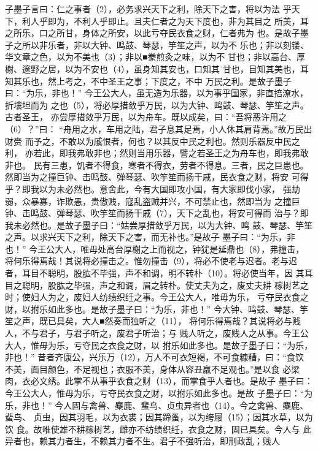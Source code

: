 \documentclass[12pt,UTF8]{ctexbook}
\begin{document}
子墨子言曰：仁之事者（2），必务求兴天下之利，除天下之害，将以为法 
乎天下，利人乎即为，不利人乎即止。且夫仁者之为天下度也，非为其目之 
所美，耳之所乐，口之所甘，身体之所安，以此亏夺民衣食之财，仁者弗为 
也。是故子墨子之所以非乐者，非以大钟、鸣鼓、琴瑟，竽笙之声，以为不 
乐也；非以刻镂、华文章之色，以为不美也（3）；非以■豢煎灸之味，以为不 
甘也；非以高台、厚榭、邃野之居，以为不安也（4），虽身知其安也，口知其 
甘也，目知其美也，耳知其乐也，然上考之，不中圣王之事；下度之，不中 
万民之利。是故子墨子曰：“为乐，非也！” 
今王公大人，虽无造为乐器，以为事乎国家，非直掊潦水，折壤坦而为 
之也（5），将必厚措敛乎万民，以为大钟、鸣鼓、琴瑟、竽笙之声。古者圣王， 
亦尝厚措敛乎万民，以为舟车。既以成矣，曰：“吾将恶许用之（6）？”曰： 
“舟用之水，车用之陆，君子息其足焉，小人休其肩背焉。”故万民出财赍 
而予之，不敢以为戚恨者，何也？以其反中民之利也。然则乐器反中民之利， 
亦若此，即我弗敢非也；然则当用乐器，譬之若圣王之为舟车也，即我弗敢 
非也。 
民有三患，饥者不得食，寒者不得衣，劳者不得息。三者，民之巨患也。 
然即当为之撞巨钟、击鸣鼓、弹琴瑟、吹竽笙而扬干戚，民衣食之财，将安 
可得乎？即我以为未必然也。意舍此，今有大国即攻小国，有大家即伐小家， 
强劫弱，众暴寡，诈欺愚，贵傲贱，寇乱盗贼并兴，不可禁止也，然即当为 
之撞巨钟、击鸣鼓、弹琴瑟、吹竽笙而扬干戚（7），天下之乱也，将安可得而 
治与？即我未必然也。是故子墨子曰：“姑尝厚措敛乎万民，以为大钟、鸣 
鼓、琴瑟、竽笙之声。以求兴天下之利，除天下之害，而无补也。”是故子 
墨子曰：“为乐，非也！” 
今王公大人，唯毋处高台厚榭之上而视之，钟犹是延鼎也（8），弗撞击， 
将何乐得焉哉！其说将必撞击之。惟勿撞击（9），将必不使老与迟者。老与迟 
者，耳目不聪明，股肱不毕强，声不和调，明不转朴（10）。将必使当年，因 
其耳目之聪明，股肱之毕强，声之和调，眉之转朴。使丈夫为之，废丈夫耕 
稼树艺之时；使妇人为之，废妇人纺绩织纴之事。今王公大人，唯毋为乐， 
亏夺民衣食之财，以拊乐如此多也。是故子墨子曰：“为乐，非也！” 
今大钟、鸣鼓、琴瑟、竽笙之声，既已具矣，大人■然奏而独听之（11）， 
将何乐得焉哉？其说将必与贱人，不与君子，与君子听之，废君子听治；与 
贱人听之，废贱人之从事。今王公大人，惟毋为乐，亏夺民之衣食之财，以 
拊乐如此多也。是故子墨子曰：“为乐，非也！” 
昔者齐康公，兴乐万（12），万人不可衣短褐，不可食糠糟，曰：“食饮 
不美，面目颜色，不足视也；衣服不美，身体从容丑羸不足观也。”是以食 
必梁肉，衣必文绣。此掌不从事乎衣食之财（13），而掌食乎人者也。是故子 
墨子曰：今王公大人，惟毋为乐，亏夺民衣食之财，以拊乐如此多也。是故 
子墨子曰：“为乐，非也！” 
今人固与禽兽、麋鹿、蜚鸟、贞虫异者也（14）。今之禽兽、麋鹿、蜚鸟、 
贞虫，因其羽毛，以为衣裘；因其蹄蚤，以为绔屦（15）；因其水草，以为饮 
食。故唯使雄不耕稼树艺，雌亦不纺绩织纴，衣食之财，固已具矣。今人与 
此异者也，赖其力者生，不赖其力者不生。君子不强听治，即刑政乱；贱人 
\end{document}
